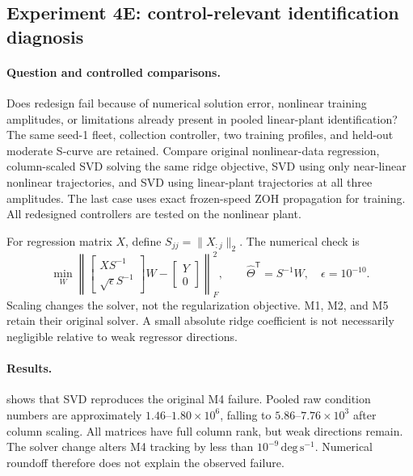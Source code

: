 \subsection{Experiment 4E: control-relevant identification diagnosis}
\label{sec:experiment4e}
\paragraph{Question and controlled comparisons.}
Does redesign fail because of numerical solution error, nonlinear training
amplitudes, or limitations already present in pooled linear-plant identification?
The same seed-1 fleet, collection controller, two training profiles, and held-out
moderate S-curve are retained. Compare original nonlinear-data regression,
column-scaled SVD solving the same ridge objective, SVD using only near-linear
nonlinear trajectories, and SVD using linear-plant trajectories at all three
amplitudes. The last case uses exact frozen-speed ZOH propagation for training.
All redesigned controllers are tested on the nonlinear plant.

For regression matrix $X$, define $S_{jj}=\|X_{:j}\|_2$. The numerical check is
\begin{equation}
 \min_W\left\|\begin{bmatrix}XS^{-1}\\\sqrt{\epsilon}S^{-1}\end{bmatrix}W
 -\begin{bmatrix}Y\\0\end{bmatrix}\right\|_F^2,
 \qquad \widehat\Theta^{\mathsf T}=S^{-1}W,\quad\epsilon=10^{-10}.
\end{equation}
Scaling changes the solver, not the regularization objective. M1, M2, and M5
retain their original solver. A small absolute ridge coefficient is not
necessarily negligible relative to weak regressor directions.

\paragraph{Results.}
 shows that SVD reproduces the original M4 failure.
Pooled raw condition numbers are approximately $1.46$--$1.80\times10^6$,
falling to $5.86$--$7.76\times10^3$ after column scaling. All matrices have
full column rank, but weak directions remain. The solver change alters M4
tracking by less than $10^{-9}\,\mathrm{deg\,s^{-1}}$. Numerical roundoff
therefore does not explain the observed failure.

